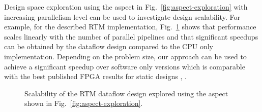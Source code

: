 Design space exploration using the aspect in
Fig.~\ref{fig:aspect-exploration} with increasing parallelism level
can be used to investigate design scalability. For example, for the
described RTM implementation, Fig.~\ref{fig:scalability} shows that
performance scales linearly with the number of parallel pipelines and
that significant speedups can be obtained by the \FAST{} dataflow
design compared to the CPU only implementation. Depending on the
problem size, our approach can be used to achieve a significant
speedup over software only versions which is comparable with the best
published FPGA results for static designs
\cite{Xinyu:Qiwei:Luk:Qiang:Pell:2012}, \cite{araya2011assessing}.


\begin{figure}[!h]
  \centering
  \hspace{-1cm}
  \caption{Scalability of the RTM dataflow design explored using the aspect
    shown in Fig.~\ref{fig:aspect-exploration}.}
  \label{fig:scalability}
\end{figure}




